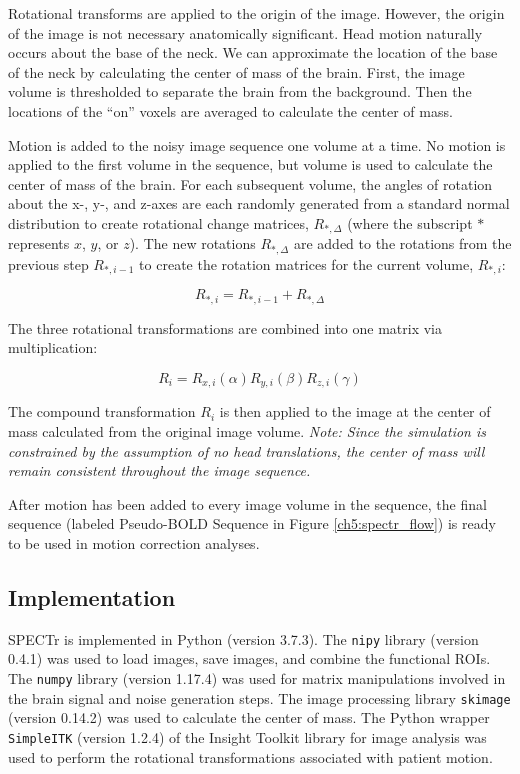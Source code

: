Rotational transforms are applied to the origin of the image. However, the origin of the image is not necessary anatomically significant. Head motion naturally occurs about the base of the neck. We can approximate the location of the base of the neck by calculating the center of mass of the brain. First, the image volume is thresholded to separate the brain from the background. Then the locations of the ``on'' voxels are averaged to calculate the center of mass. 

Motion is added to the noisy image sequence one volume at a time. No motion is applied to the first volume in the sequence, but volume is used to calculate the center of mass of the brain. For each subsequent volume, the angles of rotation about the x-, y-, and z-axes are each randomly generated from a standard normal distribution to create rotational change matrices, $R_{*,\Delta}$ (where the subscript $*$ represents $x$, $y$, or $z$). The new rotations $R_{*,\Delta}$ are added to the rotations from the previous step $R_{*,i-1}$ to create the rotation matrices for the current volume, $R_{*,i}$:

\begin{equation}
R_{*,i} = R_{*,i-1} + R_{*,\Delta}
\end{equation}

The three rotational transformations are combined into one matrix via multiplication: 

\begin{equation}
R_i = R_{x, i}(\alpha) R_{y,i}(\beta) R_{z,i}(\gamma)
\end{equation}

The compound transformation $R_i$ is then applied to the image at the center of mass calculated from the original image volume. \textit{Note: Since the simulation is constrained by the assumption of no head translations, the center of mass will remain consistent throughout the image sequence.}

After motion has been added to every image volume in the sequence, the final sequence (labeled Pseudo-BOLD Sequence in Figure \ref{ch5:spectr_flow}) is ready to be used in motion correction analyses.

\subsection{Implementation}

SPECTr is implemented in Python (version 3.7.3). The \lstinline{nipy} library (version 0.4.1) was used to load images, save images, and combine the functional ROIs. The \lstinline{numpy} library (version 1.17.4) was used for matrix manipulations involved in the brain signal and noise generation steps. The image processing library \lstinline{skimage} (version 0.14.2) was used to calculate the center of mass. The Python wrapper \lstinline{SimpleITK} (version 1.2.4) of the Insight Toolkit library for image analysis was used to perform the rotational transformations associated with patient motion.

